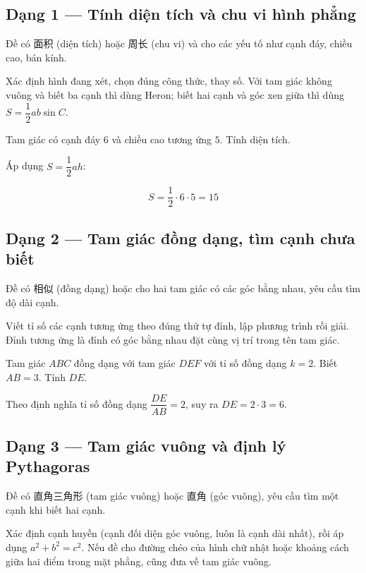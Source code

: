 \documentclass[11pt, a4paper]{article}
\begin{document}
\subsection{Dạng 1 — Tính diện tích và chu vi hình phẳng}

 Đề có 面积 (diện tích) hoặc 周长 (chu vi) và cho các yếu tố như cạnh đáy, chiều cao, bán kính.

 Xác định hình đang xét, chọn đúng công thức, thay số. Với tam giác không vuông và biết ba cạnh thì dùng Heron; biết hai cạnh và góc xen giữa thì dùng $S = \dfrac{1}{2}ab\sin C$.

\begin{vidu}[{1}]
Tam giác có cạnh đáy $6$ và chiều cao tương ứng $5$. Tính diện tích.

Áp dụng $S = \dfrac{1}{2}ah$:

$$S = \frac{1}{2} \cdot 6 \cdot 5 = 15$$

\end{vidu}
\subsection{Dạng 2 — Tam giác đồng dạng, tìm cạnh chưa biết}

 Đề có 相似 (đồng dạng) hoặc cho hai tam giác có các góc bằng nhau, yêu cầu tìm độ dài cạnh.

 Viết tỉ số các cạnh tương ứng theo đúng thứ tự đỉnh, lập phương trình rồi giải. Đỉnh tương ứng là đỉnh có góc bằng nhau đặt cùng vị trí trong tên tam giác.

\begin{vidu}[{2}]
Tam giác $ABC$ đồng dạng với tam giác $DEF$ với tỉ số đồng dạng $k = 2$. Biết $AB = 3$. Tính $DE$.

Theo định nghĩa tỉ số đồng dạng $\dfrac{DE}{AB} = 2$, suy ra $DE = 2 \cdot 3 = 6$.

\end{vidu}
\subsection{Dạng 3 — Tam giác vuông và định lý Pythagoras}

 Đề có 直角三角形 (tam giác vuông) hoặc 直角 (góc vuông), yêu cầu tìm một cạnh khi biết hai cạnh.

 Xác định cạnh huyền (cạnh đối diện góc vuông, luôn là cạnh dài nhất), rồi áp dụng $a^2+b^2 = c^2$. Nếu đề cho đường chéo của hình chữ nhật hoặc khoảng cách giữa hai điểm trong mặt phẳng, cũng đưa về tam giác vuông.
\end{document}
